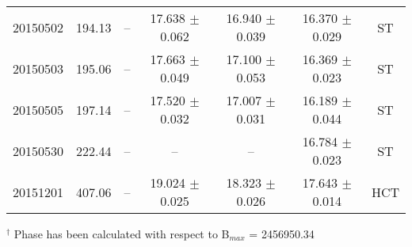 \begin{table*}
\begin{tabular}{c c c c c c c}
20150502         &  194.13  &       --                   & 17.638 $\pm$ 	0.062    &  16.940 $\pm$  0.039       &  16.370 $\pm$ 	0.029 & ST\\     
20150503         &  195.06  &       --                   & 17.663 $\pm$ 	0.049    &  17.100 $\pm$  0.053       &  16.369 $\pm$   0.023 & ST\\     
20150505         &  197.14  &       --                   & 17.520 $\pm$ 	0.032    &  17.007 $\pm$  0.031       &  16.189 $\pm$ 	0.044 & ST\\  
20150530         &  222.44  &        --                  & --                           &    --                      &  16.784 $\pm$ 	0.023 & ST\\     
20151201         &  407.06  &       --                   & 19.024 $\pm$ 	0.025    &  18.323 $\pm$  0.026       &  17.643 $\pm$ 	0.014 & HCT\\               
\hline    
\end{tabular}
\newline
$^\dagger$ Phase has been calculated with respect to B$_{max}$ = 2456950.34                                                                                       
\label{tab:photometric_observational_log}                                                        
\end{table*}                    
                   
             
  
     


































 









             
             
             
             
             
             
             
             
             
             
              
             
